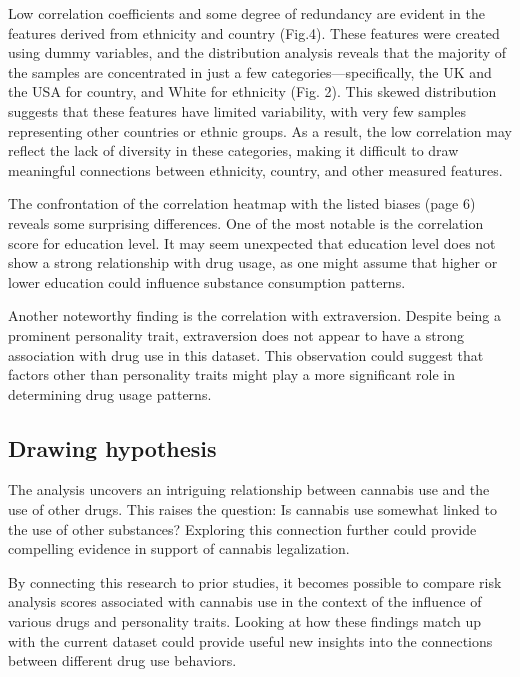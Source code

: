 \documentclass{article}
\begin{document}
Low correlation coefficients and some degree of redundancy are evident in the features derived from ethnicity and country (Fig.4). These features were created using dummy variables, and the distribution analysis reveals that the majority of the samples are concentrated in just a few categories—specifically, the UK and the USA for country, and White for ethnicity (Fig. 2). This skewed distribution suggests that these features have limited variability, with very few samples representing other countries or ethnic groups. As a result, the low correlation may reflect the lack of diversity in these categories, making it difficult to draw meaningful connections between ethnicity, country, and other measured features.


\hspace{1cm}The confrontation of the correlation heatmap with the listed biases (page 6) reveals some surprising differences. One of the most notable is the correlation score for education level. It may seem unexpected that education level does not show a strong relationship with drug usage, as one might assume that higher or lower education could influence substance consumption patterns.

Another noteworthy finding is the correlation with extraversion. Despite being a prominent personality trait, extraversion does not appear to have a strong association with drug use in this dataset. This observation could suggest that factors other than personality traits might play a more significant role in determining drug usage patterns.


\newpage
\subsection{Drawing hypothesis}

\hspace{1cm}The analysis uncovers an intriguing relationship between cannabis use and the use of other drugs. This raises the question: Is cannabis use somewhat linked to the use of other substances? Exploring this connection further could provide compelling evidence in support of cannabis legalization.

By connecting this research to prior studies, it becomes possible to compare risk analysis scores associated with cannabis use in the context of the influence of various drugs and personality traits. Looking at how these findings match up with the current dataset could provide useful new insights into the connections between different drug use behaviors. 
\end{document}

